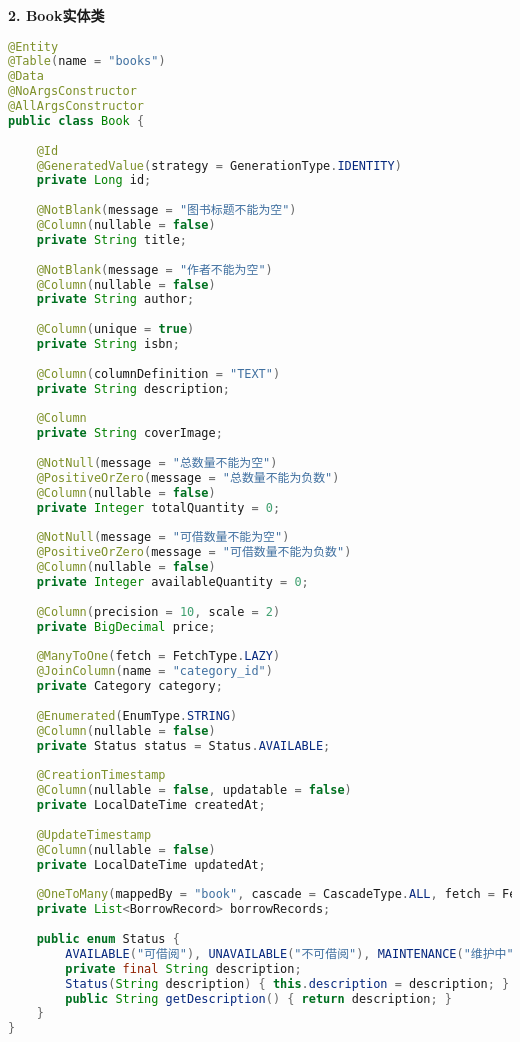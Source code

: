 \documentclass[12pt,a4paper]{article}
\begin{document}
\textbf{2. Book实体类}
\begin{lstlisting}[language=java]
@Entity
@Table(name = "books")
@Data
@NoArgsConstructor
@AllArgsConstructor
public class Book {
    
    @Id
    @GeneratedValue(strategy = GenerationType.IDENTITY)
    private Long id;
    
    @NotBlank(message = "图书标题不能为空")
    @Column(nullable = false)
    private String title;
    
    @NotBlank(message = "作者不能为空")
    @Column(nullable = false)
    private String author;
    
    @Column(unique = true)
    private String isbn;
    
    @Column(columnDefinition = "TEXT")
    private String description;
    
    @Column
    private String coverImage;
    
    @NotNull(message = "总数量不能为空")
    @PositiveOrZero(message = "总数量不能为负数")
    @Column(nullable = false)
    private Integer totalQuantity = 0;
    
    @NotNull(message = "可借数量不能为空")
    @PositiveOrZero(message = "可借数量不能为负数")
    @Column(nullable = false)
    private Integer availableQuantity = 0;
    
    @Column(precision = 10, scale = 2)
    private BigDecimal price;
    
    @ManyToOne(fetch = FetchType.LAZY)
    @JoinColumn(name = "category_id")
    private Category category;
    
    @Enumerated(EnumType.STRING)
    @Column(nullable = false)
    private Status status = Status.AVAILABLE;
    
    @CreationTimestamp
    @Column(nullable = false, updatable = false)
    private LocalDateTime createdAt;
    
    @UpdateTimestamp
    @Column(nullable = false)
    private LocalDateTime updatedAt;
    
    @OneToMany(mappedBy = "book", cascade = CascadeType.ALL, fetch = FetchType.LAZY)
    private List<BorrowRecord> borrowRecords;
    
    public enum Status {
        AVAILABLE("可借阅"), UNAVAILABLE("不可借阅"), MAINTENANCE("维护中");
        private final String description;
        Status(String description) { this.description = description; }
        public String getDescription() { return description; }
    }
}
\end{lstlisting}
\end{document}

